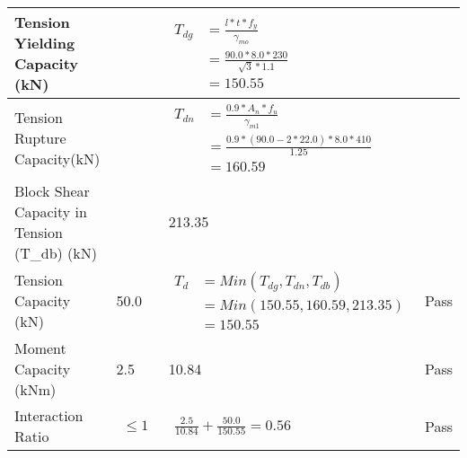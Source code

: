 \documentclass{article}%
\begin{document}
\begin{longtable}{|p{4cm}|p{5cm}|p{5.5cm}|p{1.5cm}|}
\hline%
Tension Yielding Capacity (kN)&&$\begin{aligned} T_{dg} &= \frac{l*t*f_y}{\gamma_{mo}}\\ &=\frac{90.0*8.0*230}{\sqrt{3}*1.1}\\ &=150.55\end{aligned}$&\\%
\hline%
Tension Rupture Capacity(kN)&&$\begin{aligned} T_{dn} &= \frac{0.9*A_{n}*f_u}{\gamma_{m1}}\\ &=\frac{0.9*(90.0-2*22.0)*8.0*410}{1.25}\\ &=160.59\end{aligned}$&\\%
\hline%
Block Shear Capacity in Tension (T\_db) (kN)&&213.35&\\%
\hline%
Tension Capacity (kN)&50.0&$\begin{aligned} T_d &= Min(T_{dg},T_{dn},T_{db})\\ &= Min(150.55,160.59,213.35)\\ &=150.55\end{aligned}$&Pass\\%
\hline%
Moment Capacity (kNm)&2.5&10.84&Pass\\%
\hline%
Interaction Ratio&$\begin{aligned} \leq1\end{aligned}$&$\begin{aligned} \frac{2.5}{10.84}+\frac{50.0}{150.55}=0.56\end{aligned}$&Pass\\%
\hline%
\end{longtable}

%
\end{document}

